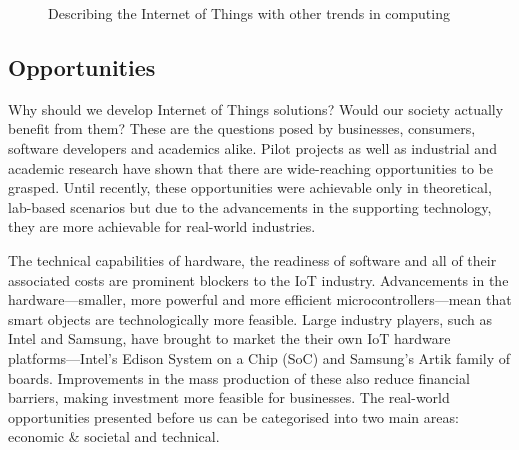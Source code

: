       \begin{figure}
        \centering
        \caption{Describing the Internet of Things with other trends in computing}\label{iotRelationship}
      \end{figure}

    \subsection{Opportunities}
      Why should we develop Internet of Things solutions? Would our society actually benefit from them? These are the questions posed by businesses, consumers, software developers and academics alike. Pilot projects as well as industrial and academic research have shown that there are wide-reaching opportunities to be grasped. Until recently, these opportunities were achievable only in theoretical, lab-based scenarios but due to the advancements in the supporting technology, they are more achievable for real-world industries.

      The technical capabilities of hardware, the readiness of software and all of their associated costs are prominent blockers to the IoT industry. Advancements in the hardware---smaller, more powerful and more efficient microcontrollers---mean that smart objects are technologically more feasible. Large industry players, such as Intel and Samsung, have brought to market the their own IoT hardware platforms---Intel's Edison System on a Chip (SoC) and Samsung's Artik family of boards. Improvements in the mass production of these also reduce financial barriers, making investment more feasible for businesses. The real-world opportunities presented before us can be categorised into two main areas: economic \& societal and technical.

